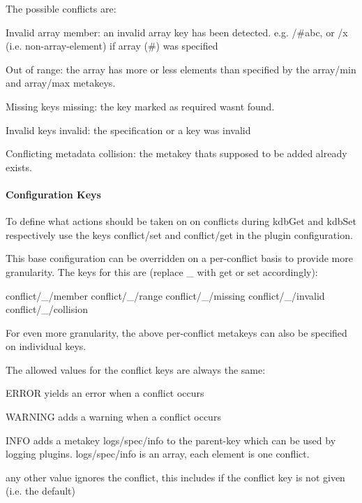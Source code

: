 The possible conflicts are\+:


\begin{DoxyItemize}
\item Invalid array {\ttfamily member}\+: an invalid array key has been detected. e.\+g. {\ttfamily /\#abc}, or {\ttfamily /x} (i.\+e. non-\/array-\/element) if array ({\ttfamily \#}) was specified
\item Out of {\ttfamily range}\+: the array has more or less elements than specified by the {\ttfamily array/min} and {\ttfamily array/max} metakeys.
\item Missing keys {\ttfamily missing}\+: the key marked as {\ttfamily require}d wasn\textquotesingle{}t found.
\item Invalid keys {\ttfamily invalid}\+: the specification or a key was invalid
\item Conflicting metadata {\ttfamily collision}\+: the metakey that\textquotesingle{}s supposed to be added already exists.
\end{DoxyItemize}

\paragraph*{Configuration Keys}

To define what actions should be taken on on conflicts during {\ttfamily kdb\+Get} and {\ttfamily kdb\+Set} respectively use the keys {\ttfamily conflict/set} and {\ttfamily conflict/get} in the plugin configuration.

This base configuration can be overridden on a per-\/conflict basis to provide more granularity. The keys for this are (replace {\ttfamily \+\_\+} with {\ttfamily get} or {\ttfamily set} accordingly)\+:


\begin{DoxyCode}
conflict/\_/member
conflict/\_/range
conflict/\_/missing
conflict/\_/invalid
conflict/\_/collision
\end{DoxyCode}


For even more granularity, the above per-\/conflict metakeys can also be specified on individual keys.

The allowed values for the conflict keys are always the same\+:


\begin{DoxyItemize}
\item {\ttfamily E\+R\+R\+OR} yields an error when a conflict occurs
\item {\ttfamily W\+A\+R\+N\+I\+NG} adds a warning when a conflict occurs
\item {\ttfamily I\+N\+FO} adds a metakey {\ttfamily logs/spec/info} to the parent-\/key which can be used by logging plugins. {\ttfamily logs/spec/info} is an array, each element is one conflict.
\item any other value ignores the conflict, this includes if the conflict key is not given (i.\+e. the default)
\end{DoxyItemize}

